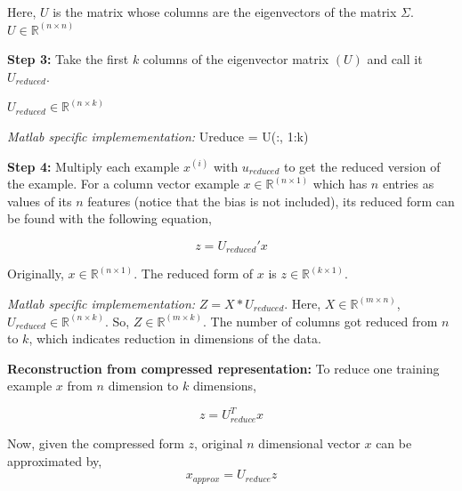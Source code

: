 \noindent Here, $ U $ is the matrix whose columns are the eigenvectors of the matrix $ \Sigma $.
$ U \in \mathbb{R}^{(n \times n)} $

\vspace{0.5cm}

\noindent \textbf{Step 3:} Take the first $ k $ columns of the eigenvector matrix $ (U) $ and call
it $ U_{reduced} $. 

\noindent $ U_{reduced} \in \mathbb{R}^{(n \times k)} $

\vspace{0.25cm}

\noindent \emph{Matlab specific implemementation:} Ureduce = U(:, 1:k)

\vspace{0.5cm}

\noindent \textbf{Step 4:} Multiply each example $ x^{(i)} $ with $ u_{reduced} $ to get the reduced
version of the example. For a column vector example $ x \in \mathbb{R}^{(n \times 1)} $ which has 
$ n $ entries as values of its $ n $ features (notice that the bias is not included), its reduced
form can be found with the following equation,

\begin{equation}
	z = U_{reduced}' x
\end{equation}

\noindent Originally, $ x \in \mathbb{R}^{(n \times 1)} $. The reduced form of $ x $ is
$ z \in \mathbb{R}^{(k \times 1)} $.

\vspace{0.25cm}

\noindent \emph{Matlab specific implemementation:} $ Z = X * U_{reduced} $.
Here, $ X \in \mathbb{R}^{(m \times n)} $, $ U_{reduced} \in \mathbb{R}^{(n \times k)} $. So,
$ Z \in \mathbb{R}^{(m \times k)} $. The number of columns got reduced from $ n $ to $ k $, which
indicates reduction in dimensions of the data.

\noindent \textbf{Reconstruction from compressed representation: }
\noindent To reduce one training example $ x $ from $ n $ dimension to $ k $ dimensions,

\begin{equation}
	z = U_{reduce}^T x
\end{equation}

\noindent Now, given the compressed form $ z $, original $ n $ dimensional vector $ x $ can be
approximated by,
\begin{equation}
	x_{approx} = U_{reduce} z
\end{equation}

